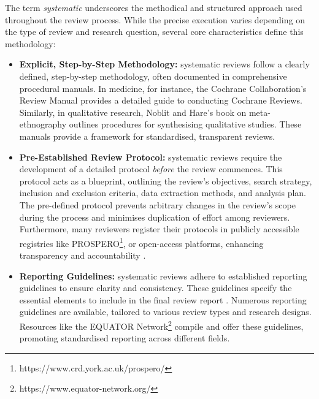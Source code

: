 \documentclass[10pt,oneside]{book}
\begin{document}
The term \emph{systematic} underscores the methodical and structured approach used throughout the review process. While the precise execution varies depending on the type of review and research question, several core characteristics define this methodology:

\begin{itemize}
    \item {\bf{Explicit, Step-by-Step Methodology:}} systematic reviews follow a clearly defined, step-by-step methodology, often documented in comprehensive procedural manuals. In medicine, for instance, the Cochrane Collaboration's Review Manual \cite{lefebvre_cochrane_2011} provides a detailed guide to conducting Cochrane Reviews. Similarly, in qualitative research, Noblit and Hare's book on meta-ethnography \cite{noblit_meta-ethnography_1988} outlines procedures for synthesising qualitative studies. These manuals provide a framework for standardised, transparent reviews.
    \item {\bf{Pre-Established Review Protocol:}} systematic reviews require the development of a detailed protocol {\it{before}} the review commences. This protocol acts as a blueprint, outlining the review's objectives, search strategy, inclusion and exclusion criteria, data extraction methods, and analysis plan. The pre-defined protocol prevents arbitrary changes in the review's scope during the process and minimises duplication of effort among reviewers. Furthermore, many reviewers register their protocols in publicly accessible registries like PROSPERO\footnote{https://www.crd.york.ac.uk/prospero/}, or open-access platforms, enhancing transparency and accountability \cite{tawfik_protocol_2020}.
    \item {\bf{Reporting Guidelines:}} systematic reviews adhere to established reporting guidelines to ensure clarity and consistency. These guidelines specify the essential elements to include in the final review report \cite{moher_preferred_2010}. Numerous reporting guidelines are available, tailored to various review types and research designs. Resources like the EQUATOR Network\footnote{https://www.equator-network.org/} compile and offer these guidelines, promoting standardised reporting across different fields.
    

\end{itemize}
\end{document}
